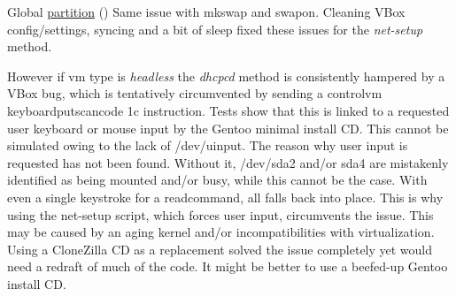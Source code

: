 
\begin{DoxyRefList}
\item[Global \mbox{\hyperlink{group__mk_file_system_gaa9952b2711fe0413d7a0bc6639c7f5a5}{partition}} ()]\label{bug__bug000001}%
%
Same issue with mkswap and swapon. Cleaning V\+Box config/settings, syncing and a bit of sleep fixed these issues for the {\itshape net-\/setup} method. 

However if vm type is {\itshape \textquotesingle{}headless\textquotesingle{}} the {\itshape dhcpcd} method is consistently hampered by a V\+Box bug, which is tentatively circumvented by sending a {\ttfamily controlvm keyboardputscancode 1c} instruction. Tests show that this is linked to a requested user keyboard or mouse input by the Gentoo minimal install CD. This cannot be simulated owing to the lack of /dev/uinput. The reason why user input is requested has not been found. Without it, /dev/sda2 and/or sda4 are mistakenly identified as being mounted and/or busy, while this cannot be the case. With even a single keystroke for a {\ttfamily read}command, all falls back into place. This is why using the net-\/setup script, which forces user input, circumvents the issue. This may be caused by an aging kernel and/or incompatibilities with virtualization. Using a Clone\+Zilla CD as a replacement solved the issue completely yet would need a redraft of much of the code. It might be better to use a beefed-\/up Gentoo install CD. 
\end{DoxyRefList}